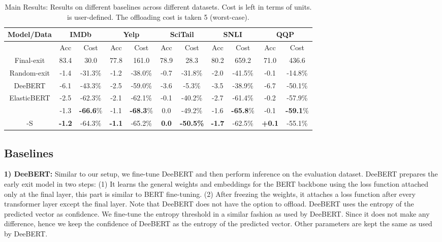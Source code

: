 \begin{table*}[]
\caption{Main Results: Results on different baselines across different datasets. Cost is left in terms of  units.  is user-defined. The offloading cost is taken 5 (worst-case).}
\label{tab: Results}
\begin{tabular}{ccccccccccc}
\hline
Model/Data  & \multicolumn{2}{c}{IMDb}         & \multicolumn{2}{c}{Yelp} & \multicolumn{2}{c}{SciTail} & \multicolumn{2}{c}{SNLI} & \multicolumn{2}{c}{QQP} \\ \hline
            & Acc           & Cost             & Acc            & Cost    & Acc             & Cost      & Acc            & Cost    & Acc           & Cost    \\ \hline
Final-exit  & 83.4          & 30.0             & 77.8           & 161.0   & 78.9            & 28.3      & 80.2           & 659.2   & 71.0          & 436.6   \\
Random-exit & -1.4          & -31.3\%          & -1.2  & -38.0\% & -0.7            & -31.8\%   & -2.0           & -41.5\% & -0.1          & -14.8\% \\
DeeBERT     & -6.1          & -43.3\%          & -2.5           & -59.0\% & -3.6            & -5.3\%    & -3.5           & -38.9\% & -6.7          & -50.1\% \\
ElasticBERT & -2.5          & -62.3\%          & -2.1           & -62.1\% & -0.1            & -40.2\%   & -2.7           & -61.4\% & -0.2          & -57.9\% \\
\our{} & -1.3 & \textbf{-66.6}\% & -1.1 & \textbf{-68.3}\% & 0.0 & -49.2\% & -1.6 & \textbf{-65.8}\% & -0.1 & \textbf{-59.1}\%\\
\our{}-S  & \textbf{-1.2} & -64.3\% & \textbf{-1.1}           & -65.2\% & \textbf{0.0}    & \textbf{-50.5\%}   & \textbf{-1.7}  & -62.5\% & \textbf{+0.1}  & -55.1\% \\ \hline
\end{tabular}
\end{table*}


\subsection{Baselines}
    \textbf{1) DeeBERT:} Similar to our setup, we fine-tune DeeBERT and then perform inference on the evaluation dataset.
    DeeBERT prepares the early exit model in two steps: (1) It learns the general weights and embeddings for the BERT backbone using the loss function attached only at the final layer, this part is similar to BERT fine-tuning. (2) After freezing the weights, it attaches a loss function after every transformer layer except the final layer. Note that DeeBERT does not have the option to offload. DeeBERT uses the entropy of the predicted vector as confidence. We fine-tune the entropy threshold in a similar fashion as used by DeeBERT. Since it does not make any difference, hence we keep the confidence of DeeBERT as the entropy of the predicted vector. Other parameters are kept the same as used by DeeBERT.


